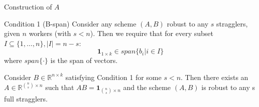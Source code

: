 \documentclass{beamer}
\begin{document}
\begin{frame}{Construction of $A$}

\begin{block}{Condition 1 (B-span)}
    Consider any scheme $(A, B)$ robust to any $s$ stragglers, given $n$ workers (with $s < n$). Then we require that for every subset $I \subseteq \{1, \dots, n\}, \lvert I \rvert = n - s$:
    \[\boldsymbol{1}_{1\times k} \in span\{b_i \vert i \in I\}\]
    where $span\{·\}$ is the span of vectors.
\end{block}

\begin{lemma}
    Consider $B \in \mathbb{R}^{n\times k}$ satisfying Condition 1 for some $s < n$. Then there exists an $A \in \mathbb{R}^{\binom{n}{s}\times n}$ such that $AB = \boldsymbol{1}_{\binom{n}{s}\times n}$ and the scheme $(A, B)$ is robust to any s full stragglers.
\end{lemma}

\end{frame}
\end{document}
